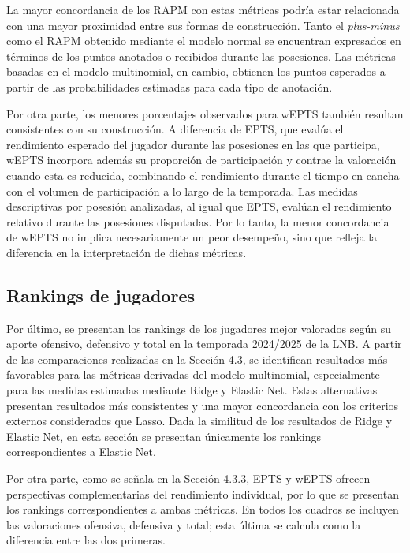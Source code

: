 \documentclass[
  12pt,
]{article}
\begin{document}
La mayor concordancia de los RAPM con estas métricas podría estar
relacionada con una mayor proximidad entre sus formas de construcción.
Tanto el \emph{plus-minus} como el RAPM obtenido mediante el modelo
normal se encuentran expresados en términos de los puntos anotados o
recibidos durante las posesiones. Las métricas basadas en el modelo
multinomial, en cambio, obtienen los puntos esperados a partir de las
probabilidades estimadas para cada tipo de anotación.

Por otra parte, los menores porcentajes observados para wEPTS también
resultan consistentes con su construcción. A diferencia de EPTS, que
evalúa el rendimiento esperado del jugador durante las posesiones en las
que participa, wEPTS incorpora además su proporción de participación y
contrae la valoración cuando esta es reducida, combinando el rendimiento
durante el tiempo en cancha con el volumen de participación a lo largo
de la temporada. Las medidas descriptivas por posesión analizadas, al
igual que EPTS, evalúan el rendimiento relativo durante las posesiones
disputadas. Por lo tanto, la menor concordancia de wEPTS no implica
necesariamente un peor desempeño, sino que refleja la diferencia en la
interpretación de dichas métricas.

\subsection{Rankings de jugadores}\label{rankings-de-jugadores}

Por último, se presentan los rankings de los jugadores mejor valorados
según su aporte ofensivo, defensivo y total en la temporada 2024/2025 de
la LNB. A partir de las comparaciones realizadas en la Sección 4.3, se
identifican resultados más favorables para las métricas derivadas del
modelo multinomial, especialmente para las medidas estimadas mediante
Ridge y Elastic Net. Estas alternativas presentan resultados más
consistentes y una mayor concordancia con los criterios externos
considerados que Lasso. Dada la similitud de los resultados de Ridge y
Elastic Net, en esta sección se presentan únicamente los rankings
correspondientes a Elastic Net.

Por otra parte, como se señala en la Sección 4.3.3, EPTS y wEPTS ofrecen
perspectivas complementarias del rendimiento individual, por lo que se
presentan los rankings correspondientes a ambas métricas. En todos los
cuadros se incluyen las valoraciones ofensiva, defensiva y total; esta
última se calcula como la diferencia entre las dos primeras.
\end{document}
